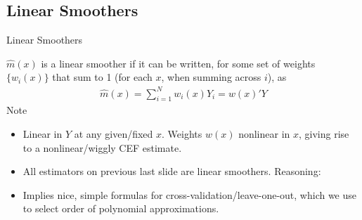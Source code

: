 \documentclass[aspectratio=169, handout]{beamer}
\newcommand{\sumiN}{\sum^N_{i=1}}
\begin{document}
\subsection{Linear Smoothers}

{\footnotesize
\begin{frame}{Linear Smoothers}

$\hat{m}(x)$ is a \alert{linear smoother}
if it can be written, for some set of weights $\{w_i(x)\}$ that sum to 1
(for each $x$, when summing across $i$), as
\begin{align*}
  \widehat{m}(x)
  =
  \sumiN
  w_i(x)
  Y_i
  =
  w(x)'Y
\end{align*}
\pause
Note
\begin{itemize}
  \item
    \alert{Linear in $Y$} at any given/fixed $x$.
    Weights $w(x)$ \alert{nonlinear} in $x$, giving rise to a
    nonlinear/wiggly CEF estimate.

  \pause
  \item \alert{All} estimators on previous last slide are linear
    smoothers.
    Reasoning:

  \pause
  \item
    Implies nice, simple formulas for
    \alert{cross-validation}/\alert{leave-one-out}, which we use to
    select order of polynomial approximations.
\end{itemize}
\end{frame}
}


\end{document}

